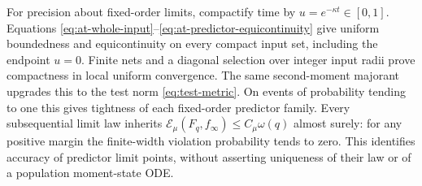 For precision about fixed-order limits, compactify time by
$u=e^{-\kappa t}\in[0,1]$.  Equations
\eqref{eq:at-whole-input}--\eqref{eq:at-predictor-equicontinuity}
give uniform boundedness and equicontinuity on every compact input set,
including the endpoint $u=0$.  Finite nets and a diagonal selection over
integer input radii prove compactness in local uniform convergence.
The same second-moment majorant upgrades this to the test norm
\eqref{eq:test-metric}.  On events of probability tending to one this
gives tightness of each fixed-order predictor family.  Every subsequential
limit law inherits $\mathcal E_\mu(F_q,f_\infty)\le C_\mu\omega(q)$
almost surely: for any positive margin the finite-width violation
probability tends to zero.  This identifies accuracy of predictor limit
points, without asserting uniqueness of their law or of a population
moment-state ODE.
